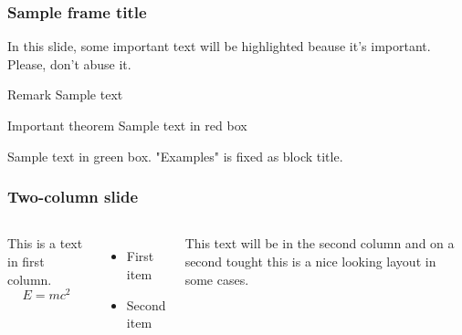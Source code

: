 \documentclass{beamer}
\begin{document}
\begin{frame}
\frametitle{Sample frame title}

In this slide, some important text will be
\alert{highlighted} beause it's important.
Please, don't abuse it.

\begin{block}{Remark}
Sample text
\end{block}

\begin{alertblock}{Important theorem}
Sample text in red box
\end{alertblock}

\begin{examples}
Sample text in green box. "Examples" is fixed as block title.
\end{examples}
\end{frame}


\begin{frame}
\frametitle{Two-column slide}

\begin{columns}

This is a text in first column.
$$E=mc^2$$
\begin{itemize}
\item First item
\item Second item
\end{itemize}

This text will be in the second column
and on a second tought this is a nice looking
layout in some cases.
\end{columns}
\end{frame}
\end{document}
